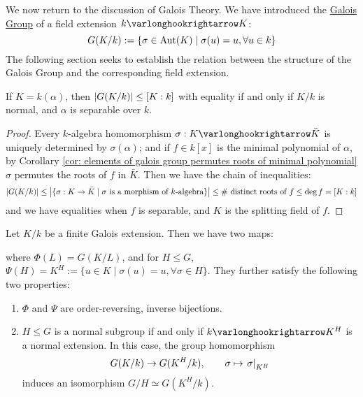 \documentclass{article}
\begin{document}
\textstart
We now return to the discussion of Galois Theory. We have introduced the \underline{Galois Group} of a field extension $k \ext K$:
\[
    G(K/k) := \{ \sigma \in \mathrm{Aut}(K) \mid \sigma(u) = u, \forall u \in k \}
\]
The following section seeks to establish the relation between the structure of the Galois Group and the corresponding field extension. 

\begin{proposition}
    If $K = k(\alpha)$, then $\left|G(K/k)\right| \leq [K : k]$ with equality if and only if $K/k$ is normal, and $\alpha$ is separable over $k$.
\end{proposition}

\begin{proof}
    Every $k$-algebra homomorphism $\sigma: K \ext \bar{K}$ is uniquely determined by $\sigma(\alpha)$; and if $f \in k[x]$ is the minimal polynomial of $\alpha$, by Corollary \ref{cor: elements of galois group permutes roots of minimal polynomial} $\sigma$ permutes the roots of $f$ in $\bar{K}$. Then we have the chain of inequalities:
    \[
        \left|G(K/k)\right| \leq \left|\{\sigma: K \to \bar{K} \mid \text{$\sigma$ is a morphism of $k$-algebra}\}\right| \leq \text{\# distinct roots of $f$} \leq \deg f = [K : k]
    \]
    and we have equalities when $f$ is separable, and $K$ is the splitting field of $f$. 
\end{proof}

\begin{theorem}\label{thm: fundamental theorem of galois theory}
    Let $K/k$ be a finite Galois extension. Then we have two maps:
    \begin{minipage}{\linewidth}
        \centering
        \vspace{1em}
        \vspace{1em}
    \end{minipage}
    where $\Phi(L) = G(K/L)$, and for $H \leq G$, $\Psi(H) = K^{H} := \{u \in K \mid \sigma(u) = u, \forall \sigma \in H\}$. They further satisfy the following two properties:
    \begin{enumerate}[label=\arabic*)]
        \item $\Phi$ and $\Psi$ are order-reversing, inverse bijections.
        \item $H \leq G$ is a normal subgroup if and only if $k \ext K^H$ is a normal extension. In this case, the group homomorphism
        \[
            G(K/k) \to G(K^H/k), \qquad \sigma \mapsto \left.\sigma\right|_{K^H}
        \]
        induces an isomorphism $G/H \simeq G(K^H/k)$. 
    \end{enumerate}
\end{theorem}
\end{document}
